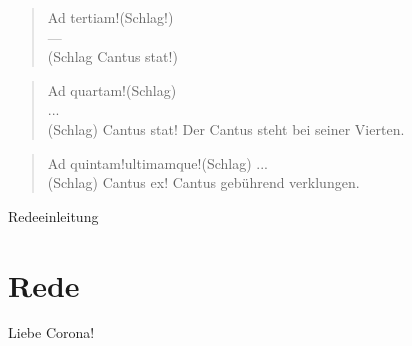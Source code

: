 \begin{quote}
    Ad tertiam!(Schlag!)\\
    ---\\
    (Schlag Cantus stat!)
\end{quote}

\begin{quote}
    Ad quartam!(Schlag)\\
    ...\\
    (Schlag) Cantus stat!
    Der Cantus steht bei seiner Vierten.
\end{quote}
\begin{quote}
    Ad quintam!ultimamque!(Schlag)
    ...\\
    (Schlag) Cantus ex!
    Cantus gebührend verklungen.
\end{quote}

Redeeinleitung

\section{Rede}
    Liebe Corona!
